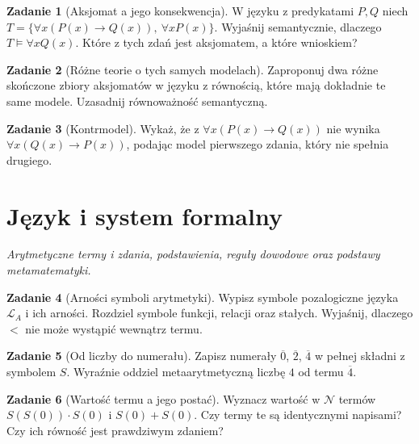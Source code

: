 \documentclass[11pt,a4paper]{article}
\numberwithin{equation}{section}
\theoremstyle{definition}
\newtheorem{zadanie}{Zadanie}[section]
\begin{document}
\begin{zadanie}[Aksjomat a jego konsekwencja]
W języku z predykatami $P,Q$ niech $T=\{\forall x(P(x)\to Q(x)),\ \forall x P(x)\}$. Wyjaśnij semantycznie, dlaczego $T\models\forall x Q(x)$. Które z tych zdań jest aksjomatem, a które wnioskiem?

\end{zadanie}


\begin{zadanie}[Różne teorie o tych samych modelach]
Zaproponuj dwa różne skończone zbiory aksjomatów w języku z równością, które mają dokładnie te same modele. Uzasadnij równoważność semantyczną.

\end{zadanie}


\begin{zadanie}[Kontrmodel]
Wykaż, że z $\forall x(P(x)\to Q(x))$ nie wynika $\forall x(Q(x)\to P(x))$, podając model pierwszego zdania, który nie spełnia drugiego.

\end{zadanie}


\section{Język i system formalny}

\noindent\textit{Arytmetyczne termy i zdania, podstawienia, reguły dowodowe oraz podstawy metamatematyki.}


\begin{zadanie}[Arności symboli arytmetyki]
Wypisz symbole pozalogiczne języka $\mathcal L_A$ i ich arności. Rozdziel symbole funkcji, relacji oraz stałych. Wyjaśnij, dlaczego $<$ nie może wystąpić wewnątrz termu.

\end{zadanie}


\begin{zadanie}[Od liczby do numerału]
Zapisz numerały $\overline0$, $\overline2$, $\overline4$ w pełnej składni z symbolem $S$. Wyraźnie oddziel metaarytmetyczną liczbę $4$ od termu $\overline4$.

\end{zadanie}


\begin{zadanie}[Wartość termu a jego postać]
Wyznacz wartość w $\mathcal N$ termów $S(S(0))\cdot S(0)$ i $S(0)+S(0)$. Czy termy te są identycznymi napisami? Czy ich równość jest prawdziwym zdaniem?

\end{zadanie}
\end{document}
